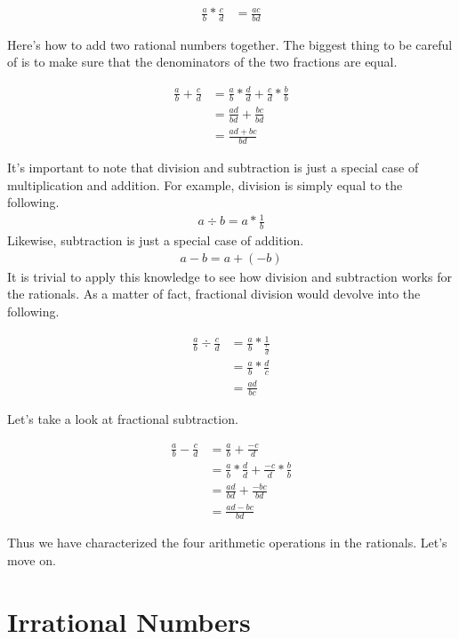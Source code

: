 \documentclass{scrbook}
\theoremstyle{definition}
\begin{document}
\begin{align*}
    \frac{a}{b} * \frac{c}{d} &= \frac{ac}{bd}
\end{align*}

Here's how to add two rational numbers together. The biggest thing to be careful of is to make sure that the denominators of the two fractions are equal.

\begin{align*}
    \frac{a}{b} + \frac{c}{d} &= \frac{a}{b} * \frac{d}{d} + \frac{c}{d} * \frac{b}{b}\\
    &= \frac{ad}{bd} + \frac{bc}{bd}\\
    &= \frac{ad + bc}{bd}
\end{align*}

It's important to note that division and subtraction is just a special case of multiplication and addition. For example, division is simply equal to the following.
\begin{align*}
    a \div b = a * \frac{1}{b}
\end{align*}
Likewise, subtraction is just a special case of addition.
\begin{align*}
    a - b = a + (-b)
\end{align*}
It is trivial to apply this knowledge to see how division and subtraction works for the rationals. As a matter of fact, fractional division would devolve into the following.

\begin{align*}
    \frac{a}{b} \div \frac{c}{d} &= \frac{a}{b} * \frac{1}{\frac{c}{d}} \\
    &= \frac{a}{b} * \frac{d}{c} \\
    &= \frac{ad}{bc}
\end{align*}

Let's take a look at fractional subtraction. 

\begin{align*}
    \frac{a}{b} - \frac{c}{d} &= \frac{a}{b} + \frac{-c}{d}\\
    &= \frac{a}{b} * \frac{d}{d} + \frac{-c}{d} * \frac{b}{b}\\
    &= \frac{ad}{bd} + \frac{-bc}{bd}\\
    &= \frac{ad - bc}{bd}
\end{align*}

Thus we have characterized the four arithmetic operations in the rationals. Let's move on.

\section{Irrational Numbers}
\end{document}
